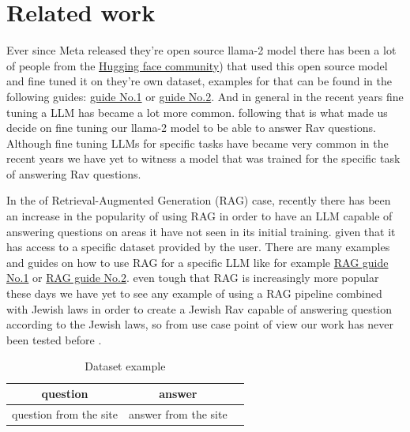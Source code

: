\documentclass[11pt]{article}
\begin{document}
\section{Related work}
Ever since Meta released they're open source llama-2 model there has been a lot of people from the \href{https://huggingface.co/ }{Hugging face community}) that used this open source model and fine tuned it on they're own dataset, examples for that can be found in the following guides:  \href{https://www.datacamp.com/tutorial/fine-tuning-llama-2 }{guide No.1} or \href{https://www.confident-ai.com/blog/the-ultimate-guide-to-fine-tune-llama-2-with-llm-evaluations }{guide No.2}. And in general in the recent years fine tuning a LLM has became a lot more common. following that is what made us decide on fine tuning our llama-2 model to be able to answer Rav questions.
Although fine tuning LLMs for specific tasks have became very common in the recent years we have yet to witness a model that was trained for the specific task of answering Rav questions.

In the of Retrieval-Augmented Generation (RAG) case, recently there has been an increase in the popularity of using RAG in order to have an LLM capable of answering questions on areas it have not seen in its initial training. given that it has access to a specific dataset provided by the user.
There are many examples and guides on how to use RAG for a specific LLM  like for example 
 \href{https://www.kaggle.com/code/gpreda/rag-using-llama-2-langchain-and-chromadb/notebook#Retrieval-Augmented-Generation }{ RAG guide No.1}
 or \href{https://blog.demir.io/hands-on-with-rag-step-by-step-guide-to-integrating-retrieval-augmented-generation-in-llms-ac3cb075ab6f }{RAG guide No.2}. even tough that RAG is increasingly more popular these days we have yet to see any example of using a RAG pipeline combined with Jewish laws in order to create a Jewish Rav capable of answering question according to the Jewish laws, so from use case point of view our work has never been tested before .
 

\begin{table}[htbp]
    \centering
    \caption{Dataset example}
    \label{tab:example}
    \begin{tabular}{ccc}
        \toprule
        question & answer   \\
        \midrule
        
        question from the site & answer from the site  \\
        
        \bottomrule
    \end{tabular}
\end{table}
\end{document}
